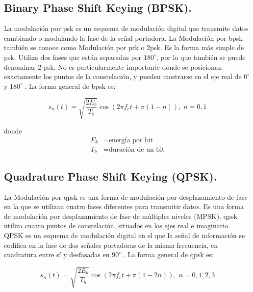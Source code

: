 \subsection*{\fontsize{12}{18}\selectfont Binary Phase Shift Keying (BPSK).}

\begin{justify}
    La modulación por \gls{psk} es un esquema de modulación digital que transmite datos cambiando o modulando la fase de la señal portadora. La Modulación por
    \gls{bpsk} también se conoce como Modulación por \gls{prk} o 2\gls{psk}. Es la forma más simple de \gls{psk}. Utiliza dos fases que están separadas por $180^\circ$,
    por lo que también se puede denominar 2-\gls{psk}. No es particularmente importante dónde se posicionan exactamente los puntos de la constelación, y pueden mostrarse
    en el eje real de $0^\circ$ y $180^\circ$ \parencite{sushmaja2013implementation}. La forma general de \gls{bpsk} es:

    \begin{equation}
        s_n (t) = \sqrt{\frac{2 E_b}{T_b}} \cos(2 \pi f_c t + \pi (1 - n)),\; n = 0,1
        \label{bpsk}
    \end{equation}

    donde
    \begin{equation*}
        \begin{array}{rl}
            E_b & = \text{energía por bit}\\
            T_b & = \text{duración de un bit}
        \end{array}
    \end{equation*}
\end{justify}

\subsection*{\fontsize{12}{18}\selectfont Quadrature Phase Shift Keying (QPSK).}

\begin{justify}
    La Modulación por \gls{qpsk} es una forma de modulación por desplazamiento de fase en la que se utilizan cuatro fases
    diferentes para transmitir datos. Es una forma de modulación por desplazamiento de fase de múltiples niveles (MPSK). \gls{qpsk} utiliza cuatro puntos de
    constelación, situados en los ejes real e imaginario. QPSK es un esquema de modulación digital en el que la señal de información se codifica en la fase
    de dos señales portadoras de la misma frecuencia, en cuadratura entre sí y desfasadas en $90^\circ$ \parencite{sushmaja2013implementation}. La forma general de \gls{qpsk} es:

    \begin{equation}
        s_n (t) = \sqrt{\frac{2 E_b}{T_b}} \cos(2 \pi f_c t + \pi (1 - 2n)),\; n = 0,1,2,3
        \label{qpsk}
    \end{equation}
\end{justify}

